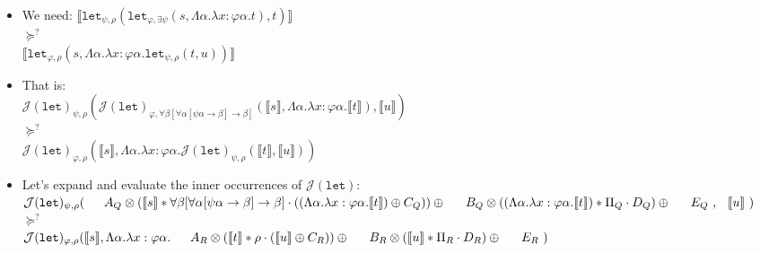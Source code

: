 \documentclass[runningheads,a4paper]{llncs}
\newcommand{\Termmap}{\mathcal{J}}
\newcommand{\interpret}[1]{\llbracket #1 \rrbracket}
\newcommand{\arrtype}{\rightarrow}
\begin{document}
\begin{itemize}
\item We need:
  $\interpret{\mathtt{let}_{\psi,\rho}(\mathtt{let}_{\varphi,\exists
  \psi}(s,\Lambda \alpha.\lambda x : \varphi\alpha.t),t)}$ \\
  $\succeq^?$ \\
  $\interpret{\mathtt{let}_{\varphi,\rho}(s,\Lambda \alpha.\lambda x:
  \varphi\alpha.\mathtt{let}_{\psi,\rho}(t,u))}$
\item That is: \\
  $\Termmap(\mathtt{let})_{\psi,\rho}(
  \Termmap(\mathtt{let})_{\varphi,\forall\beta[\forall\alpha[\psi\alpha
  \arrtype \beta] \arrtype \beta]}(
  \interpret{s},\Lambda \alpha.\lambda x : \varphi\alpha.\interpret{t}),
  \interpret{u})$ \\
  $\succeq^?$ \\
  $\Termmap(\mathtt{let})_{\varphi,\rho}(
  \interpret{s},\Lambda \alpha.\lambda x:\varphi\alpha.
  \Termmap(\mathtt{let})_{\psi,\rho}(\interpret{t},\interpret{u}))$
\item Let's expand and evaluate the inner occurrences of
  $\Termmap(\mathtt{let})$: \\
  $\Termmap(\mathtt{let})_{\psi,\rho}( \\
  \phantom{AB}
    A_Q \otimes (\interpret{s} * \forall\beta[\forall \alpha[\psi\alpha
    \arrtype \beta] \arrtype \beta] \cdot ((\Lambda \alpha.\lambda x :
  \varphi\alpha.\interpret{t}) \oplus C_Q)) \oplus \\
  \phantom{AB}
    B_Q \otimes ((\Lambda \alpha.\lambda x : \varphi\alpha.\interpret{t})
    * \Pi_Q \cdot D_Q) \oplus \\
  \phantom{AB}
    E_Q\ , \\
  \phantom{A} \interpret{u}\ )$ \\
  $\succeq^?$ \\
  $\Termmap(\mathtt{let})_{\varphi,\rho}(
  \interpret{s},\Lambda \alpha.\lambda x:\varphi\alpha. \\
  \phantom{AB}
  A_R \otimes (\interpret{t} * \rho \cdot (\interpret{u} \oplus
    C_R)) \oplus \\
  \phantom{AB}
    B_R \otimes (\interpret{u} * \Pi_R \cdot D_R) \oplus \\
  \phantom{AB}
  E_R\ )$ \\


\end{itemize}
\end{document}
